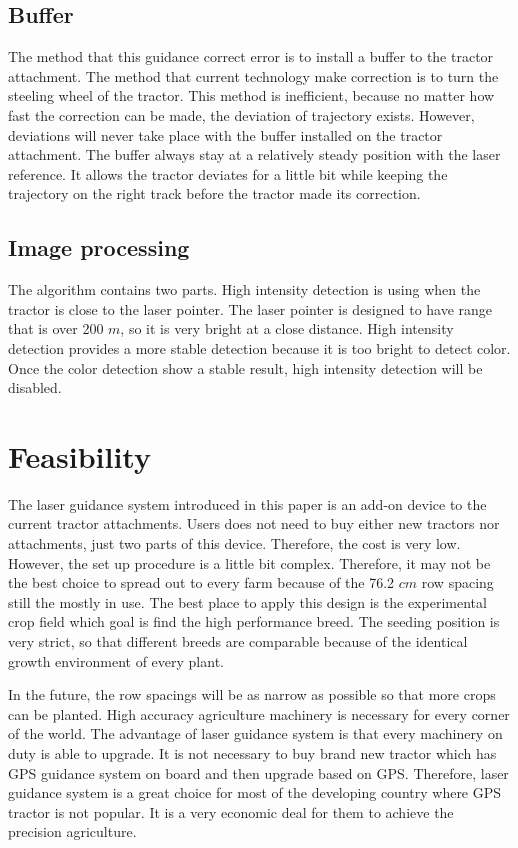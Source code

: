 \documentclass[letterpaper,12pt,oneside]{book}
\begin{document}
		\subsection{Buffer}
		The method that this guidance correct error is to install a buffer to the tractor attachment. The method that current technology make correction is to turn the steeling wheel of the tractor. This method is inefficient, because no matter how fast the correction can be made, the deviation of trajectory exists. However, deviations will never take place with the buffer installed on the tractor attachment. The buffer always stay at a relatively steady position with the laser reference. It allows the tractor deviates for a little bit while keeping the trajectory on the right track before the tractor made its correction.
		
		\subsection{Image processing}
		The algorithm contains two parts. High intensity detection is using when the tractor is close to the laser pointer. The laser pointer is designed to have range that is over 200 $m$, so it is very bright at a close distance. High intensity detection provides a more stable detection because it is too bright to detect color. Once the color detection show a stable result, high intensity detection will be disabled. 
		
		
		\section{Feasibility}
		The laser guidance system introduced in this paper is an add-on device to the current tractor attachments. Users does not need to buy either new tractors nor attachments, just two parts of this device. Therefore, the cost is very low. However, the set up procedure is a little bit complex. Therefore, it may not be the best choice to spread out to every farm because of the 76.2 $cm$ row spacing still the mostly in use. The best place to apply this design is the experimental crop field which goal is find the high performance breed. The seeding position is very strict, so that different breeds are comparable because of the identical growth environment of every plant. 
		
		In the future, the row spacings will be as narrow as possible so that more crops can be planted. High accuracy agriculture machinery is necessary for every corner of the world. The advantage of laser guidance system is that every machinery on duty is able to upgrade. It is not necessary to buy brand new tractor which has GPS guidance system on board and then upgrade based on GPS. Therefore, laser guidance system is a great choice for most of the developing country where GPS tractor is not popular. It is a very economic deal for them to achieve the precision agriculture.
		
\end{document}

